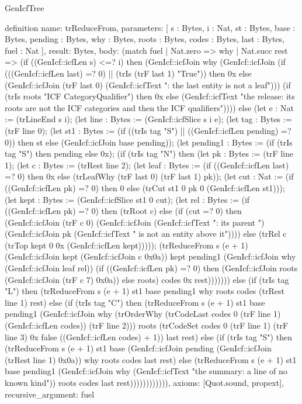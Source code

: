 \begin{lexlean}{GenIcfTree}
\begin{semanticmodule}
definition{
  name: trReduceFrom,
  parameters: [
    s : Bytes,
    i : Nat,
    st : Bytes,
    base : Bytes,
    pending : Bytes,
    why : Bytes,
    roots : Bytes,
    codes : Bytes,
    last : Bytes,
    fuel : Nat
  ],
  result: Bytes,
  body: (match fuel
    | Nat.zero => why
    | Nat.succ rest => (if ((GenIcf::icfLen s) <=? i) then (GenIcf::icfJoin why (GenIcf::icfJoin (if (((GenIcf::icfLen last) =? 0) || (trIs (trF last 1) "True")) then 0x else (GenIcf::icfJoin (trF last 0) (GenIcf::icfText ": the last entity is not a leaf\n"))) (if (trIs roots "ICF Category\nICF Qualifier\n") then 0x else (GenIcf::icfText "the release: its roots are not the ICF categories and then the ICF qualifiers\n")))) else (let e : Nat := (trLineEnd s i); (let line : Bytes := (GenIcf::icfSlice s i e); (let tag : Bytes := (trF line 0); (let st1 : Bytes := (if ((trIs tag "S") || ((GenIcf::icfLen pending) =? 0)) then st else (GenIcf::icfJoin base pending)); (let pending1 : Bytes := (if (trIs tag "S") then pending else 0x); (if (trIs tag "N") then (let pk : Bytes := (trF line 1); (let c : Bytes := (trRest line 2); (let leaf : Bytes := (if ((GenIcf::icfLen last) =? 0) then 0x else (trLeafWhy (trF last 0) (trF last 1) pk)); (let cut : Nat := (if ((GenIcf::icfLen pk) =? 0) then 0 else (trCut st1 0 pk 0 (GenIcf::icfLen st1))); (let kept : Bytes := (GenIcf::icfSlice st1 0 cut); (let rel : Bytes := (if ((GenIcf::icfLen pk) =? 0) then (trRoot c) else (if (cut =? 0) then (GenIcf::icfJoin (trF c 0) (GenIcf::icfJoin (GenIcf::icfText ": its parent ") (GenIcf::icfJoin pk (GenIcf::icfText " is not an entity above it\n")))) else (trRel c (trTop kept 0 0x (GenIcf::icfLen kept))))); (trReduceFrom s (e + 1) (GenIcf::icfJoin kept (GenIcf::icfJoin c 0x0a)) kept pending1 (GenIcf::icfJoin why (GenIcf::icfJoin leaf rel)) (if ((GenIcf::icfLen pk) =? 0) then (GenIcf::icfJoin roots (GenIcf::icfJoin (trF c 7) 0x0a)) else roots) codes 0x rest))))))) else (if (trIs tag "L") then (trReduceFrom s (e + 1) st1 base pending1 why roots codes (trRest line 1) rest) else (if (trIs tag "C") then (trReduceFrom s (e + 1) st1 base pending1 (GenIcf::icfJoin why (trOrderWhy (trCodeLast codes 0 (trF line 1) (GenIcf::icfLen codes)) (trF line 2))) roots (trCodeSet codes 0 (trF line 1) (trF line 3) 0x false ((GenIcf::icfLen codes) + 1)) last rest) else (if (trIs tag "S") then (trReduceFrom s (e + 1) st1 base (GenIcf::icfJoin pending (GenIcf::icfJoin (trRest line 1) 0x0a)) why roots codes last rest) else (trReduceFrom s (e + 1) st1 base pending1 (GenIcf::icfJoin why (GenIcf::icfText "the summary: a line of no known kind\n")) roots codes last rest)))))))))))),
  axioms: [Quot.sound, propext],
  recursive_argument: fuel
}


\end{semanticmodule}
\end{lexlean}
